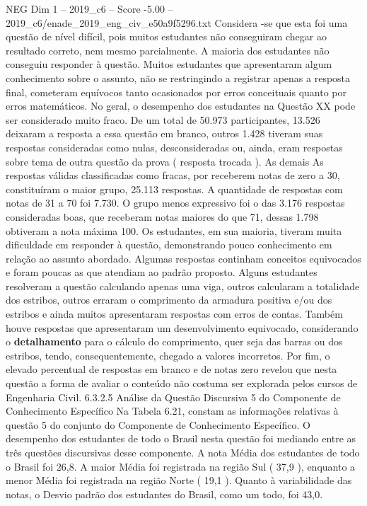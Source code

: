 \begin{textsample}{NEG Dim 1 – 2019\_c6 – Score -5.00 – 2019\_c6/enade\_2019\_eng\_civ\_e50a9f5296.txt}
Considera -se que esta foi uma questão de nível difícil, pois muitos estudantes não conseguiram chegar ao resultado correto, nem mesmo parcialmente.
A maioria dos estudantes não conseguiu responder à questão.
Muitos estudantes que apresentaram algum conhecimento sobre o assunto, não se restringindo a registrar apenas a resposta final, cometeram equívocos tanto ocasionados por erros conceituais quanto por erros matemáticos.
No geral, o desempenho dos estudantes na Questão XX pode ser considerado muito fraco.
De um total de 50.973 participantes, 13.526 deixaram a resposta a essa questão em branco, outros 1.428 tiveram suas respostas consideradas como nulas, desconsideradas ou, ainda, eram respostas sobre tema de outra questão da prova ( resposta trocada ).
As demais As respostas válidas classificadas como fracas, por receberem notas de zero a 30, constituíram o maior grupo, 25.113 respostas.
A quantidade de respostas com notas de 31 a 70 foi 7.730.
O grupo menos expressivo foi o das 3.176 respostas consideradas boas, que receberam notas maiores do que 71, dessas 1.798 obtiveram a nota máxima 100.
Os estudantes, em sua maioria, tiveram muita dificuldade em responder à questão, demonstrando pouco conhecimento em relação ao assunto abordado.
Algumas respostas continham conceitos equivocados e foram poucas as que atendiam ao padrão proposto.
Alguns estudantes resolveram a questão calculando apenas uma viga, outros calcularam a totalidade dos estribos, outros erraram o comprimento da armadura positiva e/ou dos estribos e ainda muitos apresentaram respostas com erros de contas.
Também houve respostas que apresentaram um desenvolvimento equivocado, considerando o \textbf{detalhamento} para o cálculo do comprimento, quer seja das barras ou dos estribos, tendo, consequentemente, chegado a valores incorretos.
Por fim, o elevado percentual de respostas em branco e de notas zero revelou que nesta questão a forma de avaliar o conteúdo não costuma ser explorada pelos cursos de Engenharia Civil. 6.3.2.5 Análise da Questão Discursiva 5 do Componente de Conhecimento Específico Na Tabela 6.21, constam as informações relativas à questão 5 do conjunto do Componente de Conhecimento Específico.
O desempenho dos estudantes de todo o Brasil nesta questão foi mediando entre as três questões discursivas desse componente.
A nota Média dos estudantes de todo o Brasil foi 26,8.
A maior Média foi registrada na região Sul ( 37,9 ), enquanto a menor Média foi registrada na região Norte ( 19,1 ).
Quanto à variabilidade das notas, o Desvio padrão dos estudantes do Brasil, como um todo, foi 43,0.

\end{textsample}
